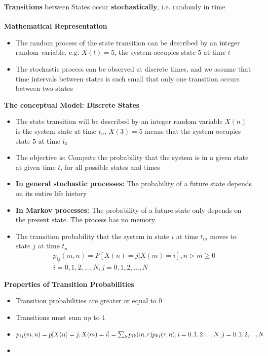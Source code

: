 \documentclass[8pt, landscape, fleqn]{scrartcl}
\begin{document}
\begin{multicols*}{3}
\textbf{Transitions} between States occur \textbf{stochastically}, i.e. randomly in time \\ \\
\textbf{Mathematical Representation}

\begin{itemize}
    \item The random process of the state transition can be described by an integer random variable, e.g. $X(t) = 5$, the system occupies state $5$ at time $t$
    \item The stochastic process can be observed at discrete times, and we assume that time intervals between states is such small that only one transition occurs between two states
\end{itemize}

\textbf{The conceptual Model: Discrete States}

\begin{itemize}
    \item The state transition will be described by an integer random variable $X(n)$ is the system state at time $t_n$, $X(3) = 5$ means that the system occupies state $5$ at time $t_3$
    \item The objective is: Compute the probability that the system is in a given state at given time $t$, for all possible states and times
\end{itemize}

\begin{itemize}
    \item \textbf{In general stochastic processes:} The probability of a future state depends on its entire life history
    \item \textbf{In Markov processes:} The probability of a future state only depends on the present state. The process has no memory 
    \item The transition probability that the system in state $i$ at time $t_m$ moves to state $j$ at time $t_n$ \begin{align}
        p_{ij}(m,n) = P\left[X(n) = j | X(m) = i\right], n> m \geq 0 \\
        i = 0,1,2,...,N, j= 0,1,2,...,N
    \end{align}
\end{itemize}

\textbf{Properties of Transition Probabilities}

\begin{itemize}
    \item Transition probabilities are greater or equal to $0$
    \item Transitions must sum up to $1$
    \item $p_{ij}(m,n) = p[X(n)=j,X(m)=i] \\ = \sum_k p_{ik}(m,r)p_{kj}(r,n), \\ i=0,1,2,...,N, j=0,1,2,...,N$
    \item 
\end{itemize}



\end{multicols*}
\end{document}
